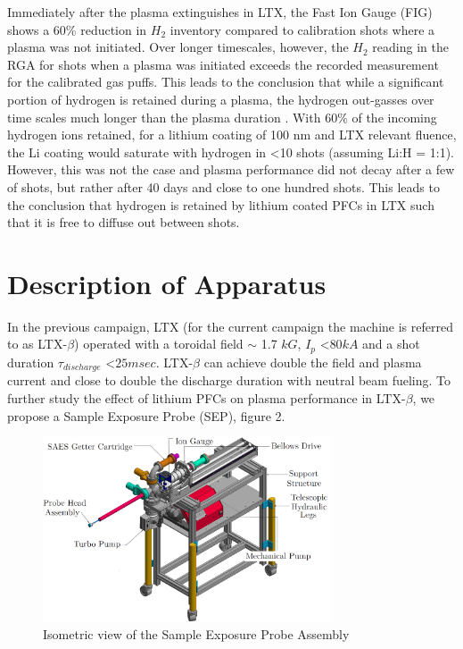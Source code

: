 \documentclass[%
 aip,
 amsmath,amssymb,
 reprint,%
]{revtex4-1}
\begin{document}
Immediately after the plasma extinguishes in LTX, the Fast Ion Gauge (FIG) shows a 60\% reduction in $H_2$ inventory compared to calibration shots where a plasma was not initiated. Over longer timescales, however, the $H_2$ reading in the RGA for shots when a plasma was initiated exceeds the recorded measurement for the calibrated gas puffs. This leads to the conclusion that while a significant portion of hydrogen is retained during a plasma, the hydrogen out-gasses over time scales much longer than the plasma duration \cite{bob-lucia,boyle-prl}. With 60\% of the incoming hydrogen ions retained, for a lithium coating of 100 nm and LTX relevant fluence, the Li coating would saturate with hydrogen in \textless 10 shots (assuming Li:H = 1:1). However, this was not the case and plasma performance did not decay after a few of shots, but rather after 40 days and close to one hundred shots. This leads to the conclusion that hydrogen is retained by lithium coated PFCs in LTX such that it is free to diffuse out between shots.

\section{Description of Apparatus}

In the previous campaign, LTX (for the current campaign the machine is referred to as LTX-$\beta$) operated with a toroidal field $\sim$ 1.7 $kG$, $I_p$ \textless $80 kA$ and a shot duration $\tau_{discharge}$ \textless $25 msec$. LTX-$\beta$ can achieve double the field and plasma current and close to double the discharge duration with neutral beam fueling. To further study the effect of lithium PFCs on plasma performance in LTX-$\beta$, we propose a Sample Exposure Probe (SEP), figure 2.

\begin{figure}%
\centering
\includegraphics[width=3.37in,keepaspectratio]{SEP_Annotated}%
\caption{Isometric view of the Sample Exposure Probe Assembly}
\end{figure}
\end{document}
